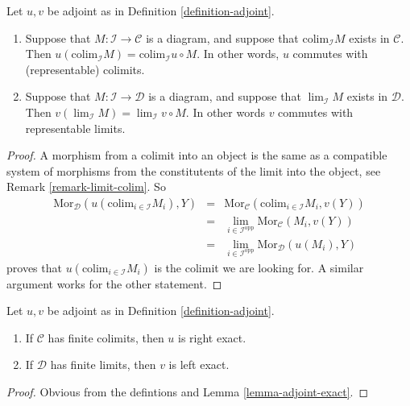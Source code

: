 \begin{lemma}
\label{lemma-adjoint-exact}
Let $u,v$ be adjoint as in Definition \ref{definition-adjoint}.
\begin{enumerate}
\item Suppose that $M : \mathcal{I} \to \mathcal{C}$ is a diagram,
and suppose that $\text{colim}_{\mathcal{I}} M$ exists in
$\mathcal{C}$. Then $u(\text{colim}_{\mathcal{I}} M) =
\text{colim}_{\mathcal{I}} u \circ M$. In other words,
$u$ commutes with (representable) colimits.
\item Suppose that $M : \mathcal{I} \to \mathcal{D}$ is a diagram,
and suppose that $\lim_{\mathcal{I}} M$ exists in
$\mathcal{D}$. Then $v(\lim_{\mathcal{I}} M) =
\lim_{\mathcal{I}} v \circ M$. In other words $v$ commutes
with representable limits.
\end{enumerate}
\end{lemma}

\begin{proof}
A morphism from a colimit into an object is the same as a compatible
system of morphisms from the constitutents of the limit into the
object, see Remark \ref{remark-limit-colim}. So
$$
\begin{matrix}
\text{Mor}_{\mathcal{D}}(u(\text{colim}_{i \in \mathcal{I}} M_i), Y)
&
=
&
\text{Mor}_{\mathcal{C}}(\text{colim}_{i \in \mathcal{I}} M_i, v(Y))
\\
&
=
&
\lim_{i \in \mathcal{I}^{\text{opp}}} \text{Mor}_{\mathcal{C}}(M_i, v(Y))
\\
&
=
&
\lim_{i \in \mathcal{I}^{\text{opp}}} \text{Mor}_{\mathcal{D}}(u(M_i), Y)
\end{matrix}
$$
proves that $u(\text{colim}_{i \in \mathcal{I}} M_i)$ is
the colimit we are looking for.
A similar argument works for the other statement.
\end{proof}

\begin{lemma}
\label{lemma-exact-adjoint}
Let $u,v$ be adjoint as in Definition \ref{definition-adjoint}.
\begin{enumerate}
\item If $\mathcal{C}$ has finite colimits, then $u$ is right exact.
\item If $\mathcal{D}$ has finite limits, then $v$ is left exact.
\end{enumerate}
\end{lemma}

\begin{proof}
Obvious from the defintions and Lemma \ref{lemma-adjoint-exact}.
\end{proof}


